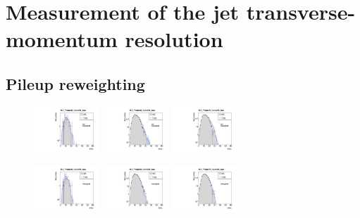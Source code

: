 \chapter{Measurement of the jet transverse-momentum resolution}
\section{Pileup reweighting}
\label{res:app:pileup}

\begin{figure}[ht]
 \centering
    \includegraphics[width=0.22\textwidth]{figures/resolution/eventSelection/NVtxComparisonWoWeights1.pdf}
    \includegraphics[width=0.22\textwidth]{figures/resolution/eventSelection/NVtxComparisonWoWeights2.pdf}
    \includegraphics[width=0.22\textwidth]{figures/resolution/eventSelection/NVtxComparisonWoWeights3.pdf}

    \includegraphics[width=0.22\textwidth]{figures/resolution/eventSelection/NVtxComparison1.pdf}
    \includegraphics[width=0.22\textwidth]{figures/resolution/eventSelection/NVtxComparison2.pdf}
    \includegraphics[width=0.22\textwidth]{figures/resolution/eventSelection/NVtxComparison3.pdf}


\end{figure}
